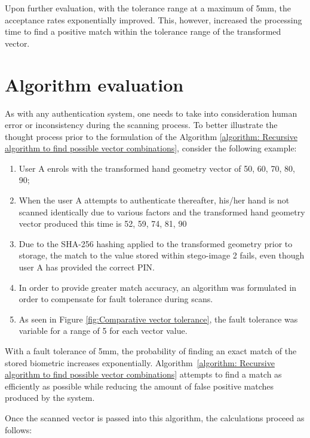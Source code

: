 Upon further evaluation, with the tolerance range at a maximum of 5mm, the acceptance rates exponentially improved. This, however, increased the processing time to find a positive match within the tolerance range of the transformed vector. 

\section{Algorithm evaluation}

As with any authentication system, one needs to take into consideration human error or inconsistency during the scanning process. To better illustrate the thought process prior to the formulation of the Algorithm \ref{algorithm: Recursive algorithm to find possible vector combinations}, consider the following example:

\begin{enumerate}[label=\roman*.]
    \item User A enrols with the transformed hand geometry vector of {50, 60, 70, 80, 90};
    \item When the user A attempts to authenticate thereafter, his/her hand is not scanned identically due to various factors and the transformed hand geometry vector produced this time is {52, 59, 74, 81, 90}
    \item Due to the SHA-256 hashing applied to the transformed geometry prior to storage, the match to the value stored within stego-image 2 fails, even though user A has provided the correct PIN.
    \item In order to provide greater match accuracy, an algorithm was formulated in order to compensate for fault tolerance during scans.
    \item As seen in Figure \ref{fig:Comparative vector tolerance}, the fault tolerance was variable for a range of 5 for each vector value.
\end{enumerate}

With a fault tolerance of 5mm, the probability of finding an exact match of the stored biometric increases exponentially. Algorithm~\ref{algorithm: Recursive algorithm to find possible vector combinations} attempts to find a match as efficiently as possible while reducing the amount of false positive matches produced by the system.

Once the scanned vector is passed into this algorithm, the calculations proceed as follows:

